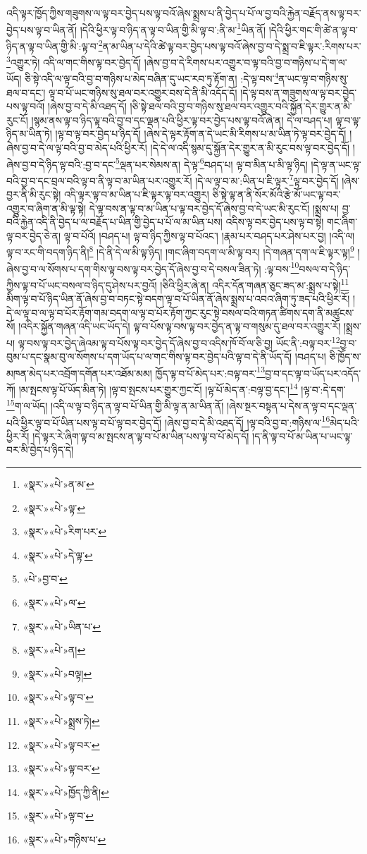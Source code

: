 འདི་ལྟར་ཁྱོད་ཀྱིས་གཟུགས་ལ་ལྟ་བར་བྱེད་པས་ལྟ་བའོ་ཞེས་སྨྲས་པ་ནི་བྱེད་པ་པོ་ལ་བྱ་བའི་རྐྱེན་བརྗོད་ནས་ལྟ་བར་བྱེད་པས་ལྟ་བ་ཡིན་ནོ། །དེའི་ཕྱིར་ལྟ་བ་ཉིད་ན་ལྟ་བ་ཡིན་གྱི་མི་ལྟ་བ་:ནི་མ་\footnote{«སྣར་»«པེ་»ན་མ་}ཡིན་ནོ། །དེའི་ཕྱིར་གང་གི་ཚེ་ན་ལྟ་བ་ཉིད་ན་ལྟ་བ་ཡིན་གྱི་མི་:ལྟ་བ་\footnote{«སྣར་»«པེ་»ལྟ་}ན་མ་ཡིན་པ་དེའི་ཚེ་ལྟ་བར་བྱེད་པས་ལྟ་བའོ་ཞེས་བྱ་བ་དེ་སྨྲ་བ་ཇི་ལྟར་:རིགས་པར་\footnote{«སྣར་»«པེ་»རིག་པར་}འགྱུར་ཏེ། འདི་ལ་གང་གིས་ལྟ་བར་བྱེད་དོ། །ཞེས་བྱ་བ་དེ་རིགས་པར་འགྱུར་བ་ལྟ་བའི་བྱ་བ་གཉིས་པ་དེ་ག་ལ་ཡོད། ཅི་སྟེ་འདི་ལ་ལྟ་བའི་བྱ་བ་གཉིས་པ་མེད་བཞིན་དུ་ཡང་རབ་ཏུ་རྟོག་ན། :དེ་ལྟ་བས་\footnote{«སྣར་»«པེ་»དེ་ལྟ་}ན་ཡང་ལྟ་བ་གཉིས་སུ་ཐལ་བ་དང་། ལྟ་བ་པོ་ཡང་གཉིས་སུ་ཐལ་བར་འགྱུར་བས་དེ་ནི་མི་འདོད་དོ། །དེ་ལྟ་བས་ན་གཟུགས་ལ་ལྟ་བར་བྱེད་པས་ལྟ་བའོ། །ཞེས་བྱ་བ་དེ་མི་འཐད་དོ། །ཅི་སྟེ་ཐལ་བའི་བྱ་བ་གཉིས་སུ་ཐལ་བར་འགྱུར་བའི་སྐྱོན་དེར་གྱུར་ན་མི་རུང་ངོ། །སྙམ་ནས་ལྟ་བ་ཉིད་ལྟ་བའི་བྱ་བ་དང་ལྡན་པའི་ཕྱིར་ལྟ་བར་བྱེད་པས་ལྟ་བའོ་ཞེ་ན། དེ་ལ་བཤད་པ། ལྟ་བ་ལྟ་ཉིད་མ་ཡིན་ཏེ། །ལྟ་བ་ལྟ་བར་བྱེད་པ་ཉིད་དོ། །ཞེས་དེ་ལྟར་རྟོག་ན་དེ་ཡང་མི་རིགས་པ་མ་ཡིན་ཏེ་ལྟ་བར་བྱེད་དོ། །ཞེས་བྱ་བ་དེ་ལ་ལྟ་བའི་བྱ་བ་མེད་པའི་ཕྱིར་རོ། །དེ་དེ་ལ་འདི་སྙམ་དུ་སྐྱོན་དེར་གྱུར་ན་མི་རུང་བས་ལྟ་བར་བྱེད་དོ། །ཞེས་བྱ་བ་དེ་ཉིད་ལྟ་བའི་:བྱ་བ་དང་\footnote{«པེ་»བྱ་བ་}ལྡན་པར་སེམས་ན། དེ་ལྟ་\footnote{«སྣར་»«པེ་»ལ་}བཤད་པ། ལྟ་བ་མིན་པ་མི་ལྟ་ཉིད། །དེ་ལྟ་ན་ཡང་ལྟ་བའི་བྱ་བ་དང་བྲལ་བའི་ལྟ་བ་ནི་ལྟ་བ་མ་ཡིན་པར་འགྱུར་རོ། །དེ་ལ་ལྟ་བ་མ་:ཡིན་པ་ཇི་ལྟར་\footnote{«སྣར་»«པེ་»ཡིན་པ་}ལྟ་བར་བྱེད་དོ། །ཞེས་བྱར་ནི་མི་རུང་སྟེ། འདི་ལྟར་ལྟ་བ་མ་ཡིན་པ་ཇི་ལྟར་ལྟ་བར་འགྱུར། ཅི་སྟེ་ལྟ་ན་ནི་སོར་མོའི་རྩེ་མོ་ཡང་ལྟ་བར་འགྱུར་བ་ཞིག་ན་མི་ལྟ་སྟེ། དེ་ལྟ་བས་ན་ལྟ་བ་མ་ཡིན་པ་ལྟ་བར་བྱེད་དོ་ཞེས་བྱ་བ་དེ་ཡང་མི་རུང་ངོ། །སྨྲས་པ། བྱ་བའི་རྐྱེན་འདི་ནི་བྱེད་པ་ལ་བརྗོད་པ་ཡིན་གྱི་བྱེད་པ་པོ་ལ་མ་ཡིན་པས། འདིས་ལྟ་བར་བྱེད་པས་ལྟ་བ་སྟེ། གང་ཞིག་ལྟ་བར་བྱེད་ཅེ་ན། ལྟ་བ་པོའོ། །བཤད་པ། ལྟ་བ་ཉིད་ཀྱིས་ལྟ་བ་པོའང་། །རྣམ་པར་བཤད་པར་ཤེས་པར་བྱ། །འདི་ལ། ལྟ་བ་རང་གི་བདག་ཉིད་ནི།\footnote{«སྣར་»«པེ་»ན།} །དེ་ནི་དེ་ལ་མི་ལྟ་ཉིད། །གང་ཞིག་བདག་ལ་མི་ལྟ་བར། །དེ་གཞན་དག་ལ་ཇི་ལྟར་ལྟ།\footnote{«སྣར་»«པེ་»བལྟ།} །ཞེས་བྱ་བ་ལ་སོགས་པ་དག་གིས་ལྟ་བས་ལྟ་བར་བྱེད་དོ་ཞེས་བྱ་བ་དེ་བསལ་ཟིན་ཏེ། :ལྟ་བས་\footnote{«སྣར་»«པེ་»ལྟ་བ་}བསལ་བ་དེ་ཉིད་ཀྱིས་ལྟ་བ་པོ་ཡང་བསལ་བ་ཉིད་དུ་ཤེས་པར་བྱའོ། །ཅིའི་ཕྱིར་ཞེ་ན། འདིར་དོན་གཞན་ཅུང་ཟད་མ་:སྨྲས་པ་སྟེ།\footnote{«སྣར་»«པེ་»སྨྲས་ཏེ།} མིག་ལྟ་བ་པོ་ཉིད་ཡིན་ནོ་ཞེས་བྱ་བ་བཏང་སྟེ་བདག་ལྟ་བ་པོ་ཡིན་ནོ་ཞེས་སྨྲས་པ་འབའ་ཞིག་ཏུ་ཟད་པའི་ཕྱིར་རོ། །དེ་ལ་ལྟ་བ་ལ་ལྟ་བ་པོར་རྟོག་གམ་བདག་ལ་ལྟ་བ་པོར་རྟོག་ཀྱང་རུང་སྟེ་བསལ་བའི་གཏན་ཚིགས་དག་ནི་མཚུངས་སོ། །འདིར་སྐྱོན་གཞན་འདི་ཡང་ཡོད་དེ། ལྟ་བ་པོས་ལྟ་བས་ལྟ་བར་བྱེད་ན་ལྟ་བ་གསུམ་དུ་ཐལ་བར་འགྱུར་རོ། །སྨྲས་པ། ལྟ་བས་ལྟ་བར་བྱེད་ཞེའམ་ལྟ་བ་པོས་ལྟ་བར་བྱེད་དོ་ཞེས་བྱ་བ་འདིས་ཁོ་བོ་ལ་ཅི་བྱ། ཡོང་ནི་:བལྟ་བར་\footnote{«སྣར་»«པེ་»ལྟ་བར་}བྱ་བ་བུམ་པ་དང་སྣམ་བུ་ལ་སོགས་པ་དག་ཡོད་པ་ལ་གང་གིས་ལྟ་བར་བྱེད་པའི་ལྟ་བ་དེ་ནི་ཡོད་དོ། །བཤད་པ། ཅི་ཁྱོད་ས་མཁན་མེད་པར་འབྲོག་དགོན་པར་འཐོམ་མམ། ཁྱོད་ལྟ་བ་པོ་མེད་པར་:བལྟ་བར་\footnote{«སྣར་»«པེ་»ལྟ་བར་}བྱ་བ་དང་ལྟ་བ་ཡོད་པར་འདོད་ཀོ། །མ་སྤངས་ལྟ་པོ་ཡོད་མིན་ཏེ། །ལྟ་བ་སྤངས་པར་གྱུར་ཀྱང་ངོ། །ལྟ་པོ་མེད་ན་:བལྟ་བྱ་དང་།\footnote{«སྣར་»«པེ་»ཁྱོད་ཀྱི་ནི།} །ལྟ་བ་:དེ་དག་\footnote{«སྣར་»«པེ་»ལྟ་བ་}ག་ལ་ཡོད། །འདི་ལ་ལྟ་བ་ཉིད་ན་ལྟ་བ་པོ་ཡིན་གྱི་མི་ལྟ་ན་མ་ཡིན་ནོ། །ཞེས་སྔར་བསྟན་པ་དེས་ན་ལྟ་བ་དང་ལྡན་པའི་ཕྱིར་ལྟ་བ་པོ་ཡིན་པས་ལྟ་བ་པོ་ལྟ་བར་བྱེད་དོ། །ཞེས་བྱ་བ་དེ་མི་འཐད་དོ། །ལྟ་བའི་བྱ་བ་:གཉིས་ལ་\footnote{«སྣར་»«པེ་»གཉིས་པ་}མེད་པའི་ཕྱིར་རོ། །དེ་ལྟར་རེ་ཞིག་ལྟ་བ་མ་སྤངས་ན་ལྟ་བ་པོ་མ་ཡིན་པས་ལྟ་བ་པོ་མེད་དོ། །ད་ནི་ལྟ་བ་པོ་མ་ཡིན་པ་ཡང་ལྟ་བར་མི་བྱེད་པ་ཉིད་དེ། 